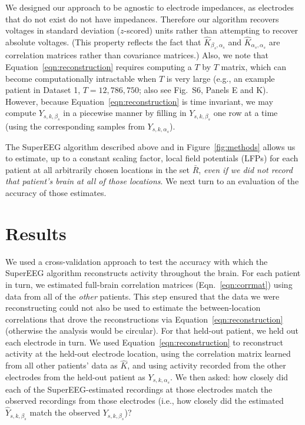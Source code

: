 \documentclass[11pt]{article}
\newcommand{\suppstats}{S6}
\begin{document}
We designed our approach to be agnostic to electrode impedances, as
electrodes that do not exist do not have impedances.  Therefore our
algorithm recovers voltages in standard deviation ($z$-scored) units
rather than attempting to recover absolute voltages. (This property
reflects the fact that $\hat{K}_{\beta_s, \alpha_s}$ and
$\hat{K}_{\alpha_s, \alpha_s}$ are correlation matrices rather than
covariance matrices.)  Also, we note that
Equation~\ref{eqn:reconstruction} requires computing a $T$ by $T$
matrix, which can become computationally intractable when $T$ is very
large (e.g., an example patient in Dataset 1, $T = 12,786,750$; also
see Fig.~\suppstats, Panels E and K). However, because
Equation~\ref{eqn:reconstruction} is time invariant, we may compute
$Y_{s,k,\beta_s}$ in a piecewise manner by filling in
$Y_{s,k,\beta_s}$ one row at a time (using the corresponding samples
from $Y_{s, k, \alpha_s}$).

The SuperEEG algorithm described above and in Figure~\ref{fig:methods}
allows us to estimate, up to a constant scaling factor, local field
potentials (LFPs) for each patient at all arbitrarily chosen locations
in the set $\bar{R}$, \textit{even if we did not record that patient's
  brain at all of those locations}.  We next turn to an evaluation of
the accuracy of those estimates.

\section*{Results}
We used a cross-validation approach to test the accuracy with which
the SuperEEG algorithm reconstructs activity throughout the brain.
For each patient in turn, we estimated full-brain correlation matrices
(Eqn.~\ref{eqn:corrmat}) using data from all of the \textit{other}
patients. This step ensured that the data we were reconstructing could
not also be used to estimate the between-location correlations that
drove the reconstructions via Equation~\ref{eqn:reconstruction}
(otherwise the analysis would be circular).  For that held-out
patient, we held out each electrode in turn.  We used
Equation~\ref{eqn:reconstruction} to reconstruct activity at the
held-out electrode location, using the correlation matrix learned from
all other patients' data as $\hat{K}$, and using activity recorded
from the other electrodes from the held-out patient as
$Y_{s, k, \alpha_s}$.  We then asked: how closely did each of the
SuperEEG-estimated recordings at those electrodes match the observed
recordings from those electrodes (i.e., how closely did the estimated
$\hat{Y}_{s, k, \beta_s}$ match the observed $Y_{s, k, \beta_s}$)?
\end{document}

